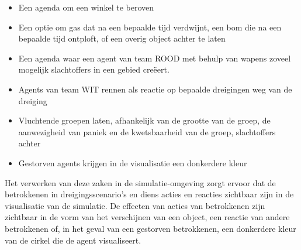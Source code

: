 \documentclass[12pt, letterpaper]{article}
\begin{document}
\begin{itemize}
    \item Een agenda om een winkel te beroven
    \item Een optie om gas dat na een bepaalde tijd verdwijnt, een bom die na een bepaalde tijd ontploft, of een overig object achter te laten
    \item Een agenda waar een agent van team ROOD met behulp van wapens zoveel mogelijk slachtoffers in een gebied creëert.
    \item Agents van team WIT rennen als reactie op bepaalde dreigingen weg van de dreiging
    \item Vluchtende groepen laten, afhankelijk van de grootte van de groep, de aanwezigheid van paniek en de kwetsbaarheid van de groep, slachtoffers achter
    \item Gestorven agents krijgen in de visualisatie een donkerdere kleur
    
\end{itemize}
Het verwerken van deze zaken in de simulatie-omgeving zorgt ervoor dat de betrokkenen in dreigingsscenario's en diens acties en reacties zichtbaar zijn in de visualisatie van de simulatie. De effecten van acties van betrokkenen zijn zichtbaar in de vorm van het verschijnen van een object, een reactie van andere betrokkenen of, in het geval van een gestorven betrokkenen, een donkerdere kleur van de cirkel die de agent visualiseert. 



\newpage
\end{document}
